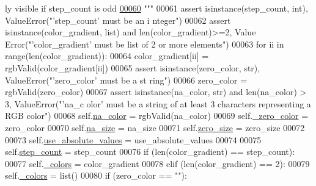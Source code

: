 \begin{DoxyCode}
{      ly visible if step\_count is odd}
\hypertarget{displayConfig_8py_source_l00060}{}\hyperlink{classnavicom_1_1displayConfig_1_1DisplayConfig_a26387ee9e6fe63612bc87a4d5d4a17f2}{00060} \textcolor{stringliteral}{        """}
00061         \textcolor{keyword}{assert} isinstance(step\_count, int), ValueError(\textcolor{stringliteral}{"'step\_count' must be an i
      nteger"})
00062         \textcolor{keyword}{assert} isinstance(color\_gradient, list) \textcolor{keywordflow}{and} len(color\_gradient)>=2, Value
      Error(\textcolor{stringliteral}{"'color\_gradient' must be list of 2 or more elements"})
00063         \textcolor{keywordflow}{for} ii \textcolor{keywordflow}{in} range(len(color\_gradient)):
00064             color\_gradient[ii] = rgbValid(color\_gradient[ii])
00065         \textcolor{keyword}{assert} isinstance(zero\_color, str), ValueError(\textcolor{stringliteral}{"'zero\_color' must be a st
      ring"})
00066         zero\_color = rgbValid(zero\_color)
00067         \textcolor{keyword}{assert} isinstance(na\_color, str) \textcolor{keywordflow}{and} len(na\_color) > 3, ValueError(\textcolor{stringliteral}{"'na\_c
      olor' must be a string of at least 3 characters representing a RGB color"})
00068         self.\hyperlink{classnavicom_1_1displayConfig_1_1DisplayConfig_ad8f95c1e3b29ac5622a18b7328b07f50}{na_color} = rgbValid(na\_color)
00069         self.\hyperlink{classnavicom_1_1displayConfig_1_1DisplayConfig_a65435f89606c60323d44bac7e1ee0340}{_zero_color} = zero\_color
00070         self.\hyperlink{classnavicom_1_1displayConfig_1_1DisplayConfig_aa157506adb33080de983987dd182fa29}{na_size} = na\_size
00071         self.\hyperlink{classnavicom_1_1displayConfig_1_1DisplayConfig_aab0e7c765bfc4071416c5e04fd7bbb2f}{zero_size} = zero\_size
00072 
00073         self.\hyperlink{classnavicom_1_1displayConfig_1_1DisplayConfig_a86870c1c1b5c920d4cc93554c7528d8a}{use_absolute_values} = use\_absolute\_values
00074 
00075         self.\hyperlink{classnavicom_1_1displayConfig_1_1DisplayConfig_a79144928881551fa1f1a18d062d761ea}{step_count} = step\_count
00076         \textcolor{keywordflow}{if} (len(color\_gradient) == step\_count):
00077             self.\hyperlink{classnavicom_1_1displayConfig_1_1DisplayConfig_aad7d4675303fbdf926ded6041ae876cf}{_colors} = color\_gradient
00078         \textcolor{keywordflow}{elif} (len(color\_gradient) == 2):
00079             self.\hyperlink{classnavicom_1_1displayConfig_1_1DisplayConfig_aad7d4675303fbdf926ded6041ae876cf}{_colors} = list()
00080             \textcolor{keywordflow}{if} (zero\_color == \textcolor{stringliteral}{""}):

\end{DoxyCode}
